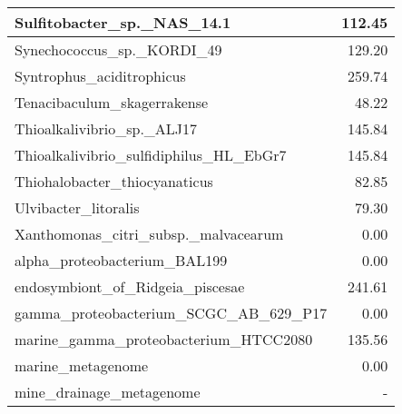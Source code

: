 \documentclass[12pt,a4paper]{article}
\begin{document}
\begin{table}[ht]
\begin{center}
\begin{tabular}{|l*{1}{|r}|}
Sulfitobacter\_sp.\_NAS\_14.1 & 112.45 \\ \hline
Synechococcus\_sp.\_KORDI\_49 & 129.20 \\ \hline
Syntrophus\_aciditrophicus & 259.74 \\ \hline
Tenacibaculum\_skagerrakense & 48.22 \\ \hline
Thioalkalivibrio\_sp.\_ALJ17 & 145.84 \\ \hline
Thioalkalivibrio\_sulfidiphilus\_HL\_EbGr7 & 145.84 \\ \hline
Thiohalobacter\_thiocyanaticus & 82.85 \\ \hline
Ulvibacter\_litoralis & 79.30 \\ \hline
Xanthomonas\_citri\_subsp.\_malvacearum & 0.00 \\ \hline
alpha\_proteobacterium\_BAL199 & 0.00 \\ \hline
endosymbiont\_of\_Ridgeia\_piscesae & 241.61 \\ \hline
gamma\_proteobacterium\_SCGC\_AB\_629\_P17 & 0.00 \\ \hline
marine\_gamma\_proteobacterium\_HTCC2080 & 135.56 \\ \hline
marine\_metagenome & 0.00 \\ \hline
mine\_drainage\_metagenome & - \\ \hline
\end{tabular}
\end{center}
\end{table}
\end{document}
